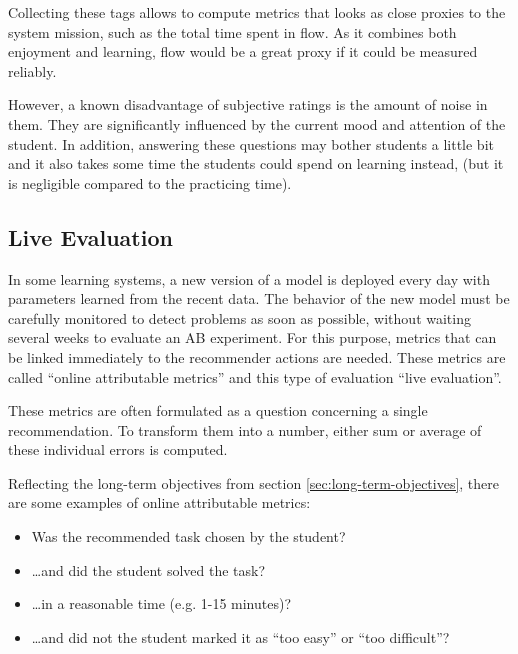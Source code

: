 Collecting these tags allows to compute metrics that looks as close proxies to
the system mission, such as the total time spent in flow.
As it combines both enjoyment and learning,
flow would be a great proxy if it could be measured reliably.

However, a known disadvantage of subjective ratings is the amount of noise
in them. They are significantly influenced by the current mood and attention of
the student.
In addition, answering these questions may bother students a little bit
and it also takes some time the students could spend on learning instead,
(but it is negligible compared to the practicing time).




\subsection{Live Evaluation}
\label{sec:live-evaluation}

In some learning systems, a new version of a model is deployed every day
  with parameters learned from the recent data.
The behavior of the new model must be carefully monitored
  to detect problems as soon as possible,
  without waiting several weeks to evaluate an AB experiment.
For this purpose, metrics that can be linked immediately
  to the recommender actions are needed.
These metrics are called ``online attributable metrics''  %
and this type of evaluation ``live evaluation''.

These metrics are often formulated as a question concerning a single recommendation.
To transform them into a number, either sum or average of these individual errors is computed.

Reflecting the long-term objectives from section \ref{sec:long-term-objectives},
  there are some examples of online attributable metrics:
\begin{itemize}
  \item Was the recommended task chosen by the student?
  \item \ldots and did the student solved the task?
  \item \ldots in a reasonable time (e.g. 1-15 minutes)?
  \item \ldots and did not the student marked it as ``too easy'' or ``too difficult''?
\end{itemize}

